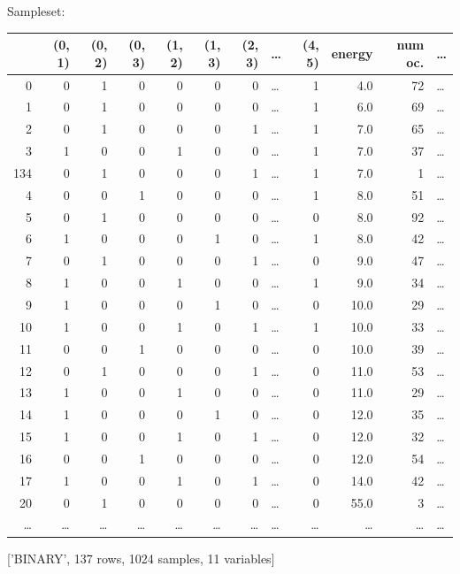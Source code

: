 \documentclass[letterpaper]{article}
\begin{document}
Sampleset:
\begin{center}
\begin{tabular}{|r|r|r|r|r|r|r|l|r|r|r|l|}
\hline
 & (0, 1) & (0, 2) & (0, 3) & (1, 2) & (1, 3) & (2, 3) & \ldots{} & (4, 5) & energy & num oc. & \ldots{}\\
\hline
0 & 0 & 1 & 0 & 0 & 0 & 0 & \ldots{} & 1 & 4.0 & 72 & \ldots{}\\
1 & 0 & 1 & 0 & 0 & 0 & 0 & \ldots{} & 1 & 6.0 & 69 & \ldots{}\\
2 & 0 & 1 & 0 & 0 & 0 & 1 & \ldots{} & 1 & 7.0 & 65 & \ldots{}\\
3 & 1 & 0 & 0 & 1 & 0 & 0 & \ldots{} & 1 & 7.0 & 37 & \ldots{}\\
134 & 0 & 1 & 0 & 0 & 0 & 1 & \ldots{} & 1 & 7.0 & 1 & \ldots{}\\
4 & 0 & 0 & 1 & 0 & 0 & 0 & \ldots{} & 1 & 8.0 & 51 & \ldots{}\\
5 & 0 & 1 & 0 & 0 & 0 & 0 & \ldots{} & 0 & 8.0 & 92 & \ldots{}\\
6 & 1 & 0 & 0 & 0 & 1 & 0 & \ldots{} & 1 & 8.0 & 42 & \ldots{}\\
7 & 0 & 1 & 0 & 0 & 0 & 1 & \ldots{} & 0 & 9.0 & 47 & \ldots{}\\
8 & 1 & 0 & 0 & 1 & 0 & 0 & \ldots{} & 1 & 9.0 & 34 & \ldots{}\\
9 & 1 & 0 & 0 & 0 & 1 & 0 & \ldots{} & 0 & 10.0 & 29 & \ldots{}\\
10 & 1 & 0 & 0 & 1 & 0 & 1 & \ldots{} & 1 & 10.0 & 33 & \ldots{}\\
11 & 0 & 0 & 1 & 0 & 0 & 0 & \ldots{} & 0 & 10.0 & 39 & \ldots{}\\
12 & 0 & 1 & 0 & 0 & 0 & 1 & \ldots{} & 0 & 11.0 & 53 & \ldots{}\\
13 & 1 & 0 & 0 & 1 & 0 & 0 & \ldots{} & 0 & 11.0 & 29 & \ldots{}\\
14 & 1 & 0 & 0 & 0 & 1 & 0 & \ldots{} & 0 & 12.0 & 35 & \ldots{}\\
15 & 1 & 0 & 0 & 1 & 0 & 1 & \ldots{} & 0 & 12.0 & 32 & \ldots{}\\
16 & 0 & 0 & 1 & 0 & 0 & 0 & \ldots{} & 0 & 12.0 & 54 & \ldots{}\\
17 & 1 & 0 & 0 & 1 & 0 & 1 & \ldots{} & 0 & 14.0 & 42 & \ldots{}\\
20 & 0 & 1 & 0 & 0 & 0 & 0 & \ldots{} & 0 & 55.0 & 3 & \ldots{}\\
\ldots{} & \ldots{} & \ldots{} & \ldots{} & \ldots{} & \ldots{} & \ldots{} & \ldots{} & \ldots{} & \ldots{} & \ldots{} & \ldots{}\\
\hline
\end{tabular}
\end{center}
['BINARY', 137 rows, 1024 samples, 11 variables]
\end{document}
